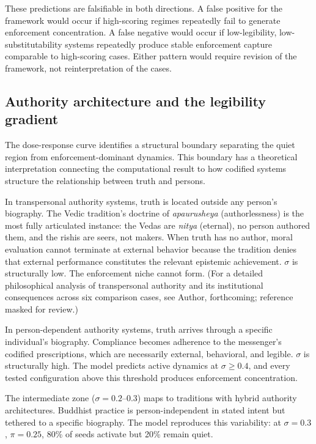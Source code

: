 \documentclass[12pt]{article}
\begin{document}
These predictions are falsifiable in both directions. A false positive for the framework would occur if high-scoring regimes repeatedly fail to generate enforcement concentration. A false negative would occur if low-legibility, low-substitutability systems repeatedly produce stable enforcement capture comparable to high-scoring cases. Either pattern would require revision of the framework, not reinterpretation of the cases.

\subsection{Authority architecture and the legibility gradient}

The dose-response curve identifies a structural boundary separating the quiet region from enforcement-dominant dynamics. This boundary has a theoretical interpretation connecting the computational result to how codified systems structure the relationship between truth and persons.

In transpersonal authority systems, truth is located outside any person's biography. The Vedic tradition's doctrine of \textit{apaurusheya} (authorlessness) is the most fully articulated instance: the Vedas are \textit{nitya} (eternal), no person authored them, and the rishis are seers, not makers. When truth has no author, moral evaluation cannot terminate at external behavior because the tradition denies that external performance constitutes the relevant epistemic achievement. $\sigma$ is structurally low. The enforcement niche cannot form. (For a detailed philosophical analysis of transpersonal authority and its institutional consequences across six comparison cases, see Author, forthcoming; reference masked for review.)

In person-dependent authority systems, truth arrives through a specific individual's biography. Compliance becomes adherence to the messenger's codified prescriptions, which are necessarily external, behavioral, and legible. $\sigma$ is structurally high. The model predicts active dynamics at $\sigma \geq 0.4$, and every tested configuration above this threshold produces enforcement concentration.

The intermediate zone ($\sigma = 0.2$--0.3) maps to traditions with hybrid authority architectures. Buddhist practice is person-independent in stated intent but tethered to a specific biography. The model reproduces this variability: at $\sigma = 0.3$, $\pi = 0.25$, 80\% of seeds activate but 20\% remain quiet.
\end{document}
